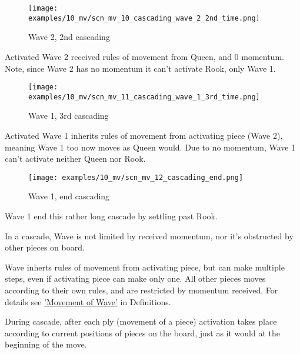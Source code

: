 \clearpage %

\noindent
\begin{wrapfigure}[7]{l}{0.5625\textwidth}
\centering
\texttt{[image: examples/10\_mv/scn\_mv\_10\_cascading\_wave\_2\_2nd\_time.png]}
\caption{Wave 2, 2nd cascading}
\label{fig:scn_mv_10_cascading_wave_2_2nd_time}
\end{wrapfigure}
Activated Wave 2 received rules of movement from Queen, and 0 momentum.
Note, since Wave 2 has no momentum it can't activate Rook, only Wave 1.

\vspace*{0.245\textheight}
\noindent
\begin{wrapfigure}[9]{r}{0.5625\textwidth}
\centering
\texttt{[image: examples/10\_mv/scn\_mv\_11\_cascading\_wave\_1\_3rd\_time.png]}
\caption{Wave 1, 3rd cascading}
\label{fig:scn_mv_11_cascading_wave_1_3rd_time}
\end{wrapfigure}
Activated Wave 1 inherits rules of movement from activating piece (Wave 2),
meaning Wave 1 too now moves as Queen would. Due to no momentum, Wave 1 can't
activate neither Queen nor Rook.

\clearpage %

\noindent
\begin{wrapfigure}[3]{l}{0.5625\textwidth}
\centering
\texttt{[image: examples/10\_mv/scn\_mv\_12\_cascading\_end.png]}
\caption{Wave 1, end cascading}
\label{fig:scn_mv_12_cascading_end}
\end{wrapfigure}
Wave 1 end this rather long cascade by settling past Rook.

\vspace*{0.345\textheight}
In a cascade, Wave is not limited by received momentum, nor it's obstructed by
other pieces on board.

Wave inherts rules of movement from activating piece, but can make multiple
steps, even if activating piece can make only one. All other pieces moves
according to their own rules, and are restricted by momentum received. For
details see \hyperref[sec:Definitions/Movement of Wave]{'Movement of Wave'} in
Definitions.

During cascade, after each ply (movement of a piece) activation takes place
according to current positions of pieces on the board, just as it would at the
beginning of the move.

